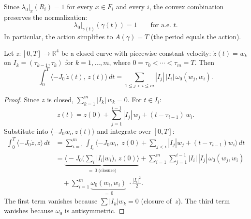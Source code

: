\begin{remark}\label{rem:contact-normalization}
Since $\lambda_0|_x(R_i) = 1$ for every $x \in F_i$ and every
$i$, the convex combination preserves the normalization:
\[
  \lambda_0|_{\gamma(t)}(\dot{\gamma}(t)) = 1
  \qquad \text{for a.e.\ } t.
\]
In particular, the action simplifies to $A(\gamma) = T$
(the period equals the action).
\end{remark}

\begin{lemma}\label{lem:shoelace}
Let $z \colon [0, T] \to \mathbb{R}^4$ be a closed curve with
piecewise-constant velocity:
$\dot{z}(t) = w_k$ on $I_k = (\tau_{k-1}, \tau_k)$ for
$k = 1, \ldots, m$, where $0 = \tau_0 < \cdots < \tau_m = T$.
Then
\begin{equation}\label{eq:shoelace}
  \int_0^T \langle -J_0\, \dot{z}(t),\, z(t) \rangle \, dt
  = \sum_{1 \leq j < i \leq m}
    |I_j|\, |I_i|\, \omega_0(w_j, w_i).
\end{equation}
\end{lemma}

\begin{proof}
Since $z$ is closed, $\sum_{k=1}^m |I_k|\, w_k = 0$.
For $t \in I_i$:
\[
  z(t) = z(0) + \sum_{j=1}^{i-1} |I_j|\, w_j
    + (t - \tau_{i-1})\, w_i.
\]
Substitute into
$\langle -J_0 w_i, z(t) \rangle$ and integrate over $[0, T]$:
\begin{align*}
\int_0^T \!\langle{-}J_0 \dot{z}, z \rangle \, dt
  &= \sum_{i=1}^m \int_{I_i}
    \!\langle -J_0 w_i,\;
      z(0) + \textstyle\sum_{j < i} |I_j| w_j
      + (t{-}\tau_{i-1}) w_i
    \rangle\, dt \\
  &= \underbrace{
      \bigl\langle -J_0 \bigl(\textstyle\sum_i |I_i| w_i\bigr),\,
      z(0) \bigr\rangle
    }_{= \, 0 \;\text{(closure)}}
  + \sum_{i=1}^m \sum_{j=1}^{i-1}
      |I_i|\, |I_j|\, \omega_0(w_j, w_i) \\
  &\quad
  + \sum_{i=1}^m
      \underbrace{\omega_0(w_i, w_i)}_{= \, 0}\;
      \cdot \tfrac{|I_i|^2}{2}.
\end{align*}
The first term vanishes because
$\sum |I_k| w_k = 0$ (closure of~$z$).
The third term vanishes because
$\omega_0$ is antisymmetric.
\end{proof}

